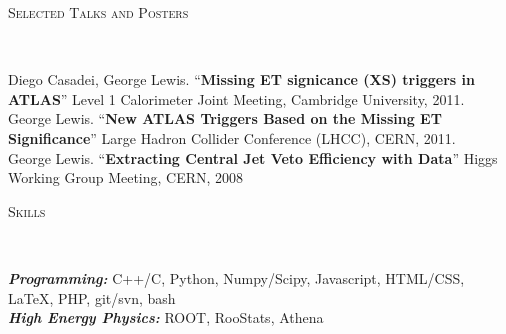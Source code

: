 \documentclass[9pt]{article}
\newenvironment{changemargin}[2]{%
  \begin{list}{}{%
    \setlength{\topsep}{0pt}%
    \setlength{\leftmargin}{#1}%
    \setlength{\rightmargin}{#2}%
    \setlength{\listparindent}{\parindent}%
    \setlength{\itemindent}{\parindent}%
    \setlength{\parsep}{\parskip}%
  }%
  \item[]}{\end{list}
}
\newcommand{\lineover}{
	\begin{changemargin}{-0.05in}{-0.05in}
		\vspace*{-8pt}
		\hrulefill \\
		\vspace*{-2pt}
	\end{changemargin}
}
\newcommand{\header}[1]{
	\begin{changemargin}{-0.5in}{-0.5in}
		\scshape{#1}\\
  	\lineover
	\end{changemargin}
}
\newenvironment{body} {
	\vspace*{-16pt}
	\begin{changemargin}{-0.25in}{-0.5in}
  }	
	{\end{changemargin}
}
\begin{document}
\header{Selected Talks and Posters}
\begin{body}
	\vspace{14pt}
        Diego Casadei, George Lewis. ``\textbf{Missing ET signicance (XS) triggers in ATLAS}'' Level 1 Calorimeter Joint Meeting, Cambridge University, 2011. \\
        \medskip
        George Lewis.  ``\textbf{New ATLAS Triggers Based on the Missing ET Significance}'' Large Hadron Collider Conference (LHCC), CERN, 2011. \\
        George Lewis. ``\textbf{Extracting Central Jet Veto Efficiency with Data}'' Higgs Working Group Meeting, CERN, 2008 \\
\end{body}

\smallskip



\header{Skills}

\begin{body}
	\vspace{14pt}
	\emph{\textbf{Programming:}}{} C++/C, Python, Numpy/Scipy, Javascript, HTML/CSS, \LaTeX, PHP, git/svn, bash \\
	\emph{\textbf{High Energy Physics:}}{} ROOT, RooStats, Athena\\
\end{body}

\smallskip
\end{document}
